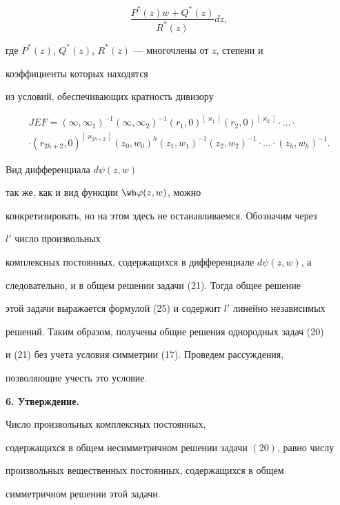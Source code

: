 $$ 


\frac{P^*(z)w+Q^*(z)}{R^*(z)}dz, 


$$ 


где $P^*(z)$, $Q^*(z)$, $R^*(z)$ --- многочлены от $z$, степени и 


коэффициенты которых находятся 


из условий, обеспечивающих кратность дивизору 


\begin{multline*}  


JEF=(\infty,\infty_1)^{-1}


(\infty,\infty_2)^{-1}(r_1,0)^{[\varkappa_1]} 


(r_2,0)^{[\varkappa_2]}\cdot\dotsc\cdot \\


%


\cdot(r_{2h+2},0)^{[\varkappa_{2h+2}]}(z_0,w_0)^{h} 


(z_1,w_1)^{-1}(z_2,w_2)^{-1}\cdot\dotsc\cdot(z_h,w_h)^{-1}. 


\end{multline*}  


Вид дифференциала $d\psi(z,w)$


так же, как и вид функции $\wh\varphi(z,w)$, можно 


конкретизировать, но на этом здесь не останавливаемся. Обозначим через 


$l'$ число произвольных 


комплексных постоянных, содержащихся в дифференциале $d\psi(z,w)$, а 


следовательно, и в общем решении задачи (21). Тогда общее решение 


этой задачи выражается формулой (25) и содержит $l'$ линейно независимых 


решений. Таким образом, получены общие решения однородных задач (20) 


и (21) без учета условия симметрии (17). Проведем рассуждения, 


позволяющие учесть это условие. 


\medskip 


 


{\bf 6. Утверждение.} {\it 


Число произвольных комплексных постоянных, 


содержащихся в общем несимметричном решении задачи $(20)$, равно числу 


произвольных вещественных постоянных, содержащихся в общем 


симметричном решении этой задачи. 


} 


